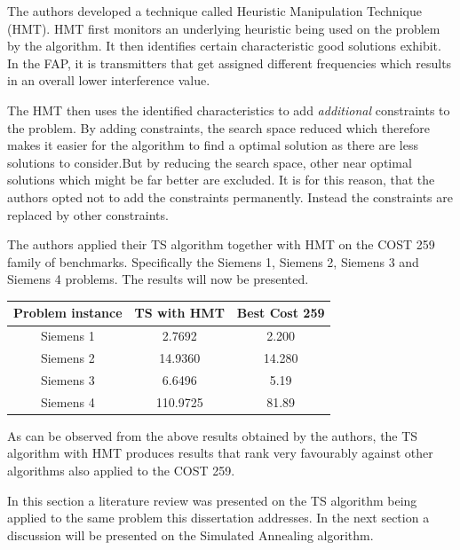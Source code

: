 The authors developed a technique called Heuristic Manipulation Technique (HMT). HMT first monitors an underlying heuristic being used on the problem by the algorithm\cite{TabuMontemanniSmith}. It then identifies certain characteristic good solutions exhibit. In the FAP, it is transmitters that get assigned different frequencies which results in an overall lower interference value\cite{TabuMontemanniSmith}.

The HMT then uses the identified characteristics to add \emph{additional} constraints to the problem\cite{TabuMontemanniSmith}. By adding constraints, the search space reduced which therefore makes it easier for the algorithm to find a optimal solution as there are less solutions to consider.But by reducing the search space, other near optimal solutions which might be far better are excluded\cite{TabuMontemanniSmith}. It is for this reason, that the authors opted not to add the constraints permanently. Instead the constraints are replaced by other constraints\cite{TabuMontemanniSmith}.

The authors applied their TS algorithm together with HMT on the COST 259 family of benchmarks. Specifically the Siemens 1, Siemens 2, Siemens 3 and Siemens 4 problems.  The results will now be presented.

\begin{center}
	\begin{tabular}{| c | c | c |}
		\hline
		Problem instance & TS with HMT & Best Cost 259 \\ \hline
		Siemens 1 & 2.7692 & 2.200 \\ \hline
		Siemens 2 & 14.9360 & 14.280 \\ \hline
		Siemens 3 & 6.6496 & 5.19 \\ \hline
		Siemens 4 & 110.9725 & 81.89 \\ \hline
	\end{tabular}
\end{center}
As can be observed from the above results obtained by the authors, the TS algorithm with HMT produces results that rank very favourably against other algorithms also applied to the COST 259.

In this section a literature review was presented on the TS algorithm being applied to the same problem this dissertation addresses. In the next section a discussion will be presented on the Simulated Annealing algorithm.

